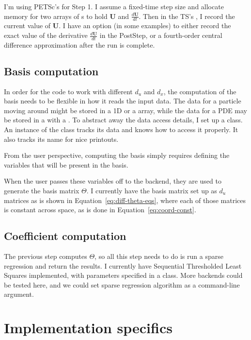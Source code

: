 \documentclass{article}
\let\vec\mathbf
\def\lstinline#1{}%
\begin{document}
I'm using PETSc's \lstinline{TS} for Step 1. I assume a fixed-time step size and
allocate memory for two arrays of \lstinline{Vec}s to hold $\vec{U}$ and
$\frac{d\vec{U}}{dt}$. Then in the TS's \lstinline{PostStep}, I record the
current value of $\vec{U}$. I have an option (in some examples) to either record
the exact value of the derivative $\frac{d\vec{U}}{dt}$ in the PostStep, or a
fourth-order central difference approximation after the run is complete.


\subsection{Basis computation}

In order for the code to work with different $d_u$ and $d_x$, the computation of
the basis needs to be flexible in how it reads the input data. The data
for a particle moving around might be stored in a 1D \lstinline{Vec} or a
\lstinline{PetscScalar} array, while the data for a PDE may be stored in a
\lstinline{Vec} with a \lstinline{DMDA}. To abstract away the data access
details, I set up a \lstinline{Variable} class. An instance of the class tracks
its data and knows how to access it properly. It also tracks its name for nice
printouts.

From the user perspective, computing the basis simply requires defining the variables
that will be present in the basis.

When the user passes these variables off to the backend, they are used to
generate the basis matrix $\Theta$.
I currently have the basis matrix set up as $d_u$ matrices as is shown in Equation~\ref{eq:diff-theta-eqs}, where
each of those matrices is constant across space, as is done in Equation~\ref{eq:coord-const}.


\subsection{Coefficient computation}

The previous step computes $\Theta$, so all this step needs to do is run a
sparse regression and return the results. I currently have Sequential
Thresholded Least Squares implemented, with parameters specified in a
\lstinline{SparseReg} class. More backends could be tested here, and we could
set sparse regression algorithm as a command-line argument.

\section{Implementation specifics}
\end{document}

